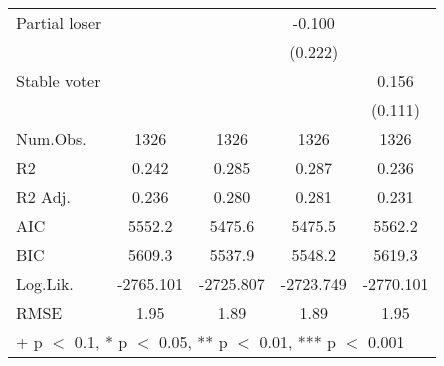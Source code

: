 \begin{table}
\begin{tabular}[t]{lcccc}
Partial loser &  &  & -0.100 & \\
 &  &  & (0.222) & \\
Stable voter &  &  &  & 0.156\\
 &  &  &  & (0.111)\\
\midrule
Num.Obs. & 1326 & 1326 & 1326 & 1326\\
R2 & 0.242 & 0.285 & 0.287 & 0.236\\
R2 Adj. & 0.236 & 0.280 & 0.281 & 0.231\\
AIC & 5552.2 & 5475.6 & 5475.5 & 5562.2\\
BIC & 5609.3 & 5537.9 & 5548.2 & 5619.3\\
Log.Lik. & -2765.101 & -2725.807 & -2723.749 & -2770.101\\
RMSE & 1.95 & 1.89 & 1.89 & 1.95\\
\bottomrule
\multicolumn{5}{l}{\rule{0pt}{1em}+ p $<$ 0.1, * p $<$ 0.05, ** p $<$ 0.01, *** p $<$ 0.001}\\
\end{tabular}
\end{table}
